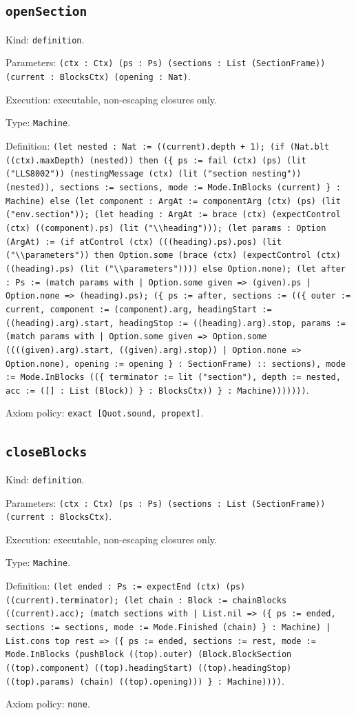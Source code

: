 \documentclass[11pt]{article}
\begin{document}
\subsection*{\texttt{openSection}}
\noindent Kind: \texttt{definition}.\par
\noindent Parameters: \texttt{(ctx : Ctx) (ps : Ps) (sections : List (SectionFrame)) (current : BlocksCtx) (opening : Nat)}.\par
\noindent Execution: executable, non-escaping closures only.\par
\noindent Type: \texttt{Machine}.\par
\noindent Definition: \texttt{(let nested : Nat := ((current).depth + 1); (if (Nat.blt ((ctx).maxDepth) (nested)) then (\{ ps := fail (ctx) (ps) (lit ("LLS8002")) (nestingMessage (ctx) (lit ("section nesting")) (nested)), sections := sections, mode := Mode.InBlocks (current) \} : Machine) else (let component : ArgAt := componentArg (ctx) (ps) (lit ("env.section")); (let heading : ArgAt := brace (ctx) (expectControl (ctx) ((component).ps) (lit ("\textbackslash{}\textbackslash{}heading"))); (let params : Option (ArgAt) := (if atControl (ctx) (((heading).ps).pos) (lit ("\textbackslash{}\textbackslash{}parameters")) then Option.some (brace (ctx) (expectControl (ctx) ((heading).ps) (lit ("\textbackslash{}\textbackslash{}parameters")))) else Option.none); (let after : Ps := (match params with | Option.some given => (given).ps | Option.none => (heading).ps); (\{ ps := after, sections := ((\{ outer := current, component := (component).arg, headingStart := ((heading).arg).start, headingStop := ((heading).arg).stop, params := (match params with | Option.some given => Option.some ((((given).arg).start, ((given).arg).stop)) | Option.none => Option.none), opening := opening \} : SectionFrame) :: sections), mode := Mode.InBlocks ((\{ terminator := lit ("section"), depth := nested, acc := ([] : List (Block)) \} : BlocksCtx)) \} : Machine)))))))}.\par
\noindent Axiom policy: \texttt{exact [Quot.sound, propext]}.\par
\subsection*{\texttt{closeBlocks}}
\noindent Kind: \texttt{definition}.\par
\noindent Parameters: \texttt{(ctx : Ctx) (ps : Ps) (sections : List (SectionFrame)) (current : BlocksCtx)}.\par
\noindent Execution: executable, non-escaping closures only.\par
\noindent Type: \texttt{Machine}.\par
\noindent Definition: \texttt{(let ended : Ps := expectEnd (ctx) (ps) ((current).terminator); (let chain : Block := chainBlocks ((current).acc); (match sections with | List.nil => (\{ ps := ended, sections := sections, mode := Mode.Finished (chain) \} : Machine) | List.cons top rest => (\{ ps := ended, sections := rest, mode := Mode.InBlocks (pushBlock ((top).outer) (Block.BlockSection ((top).component) ((top).headingStart) ((top).headingStop) ((top).params) (chain) ((top).opening))) \} : Machine))))}.\par
\noindent Axiom policy: \texttt{none}.\par
\end{document}
